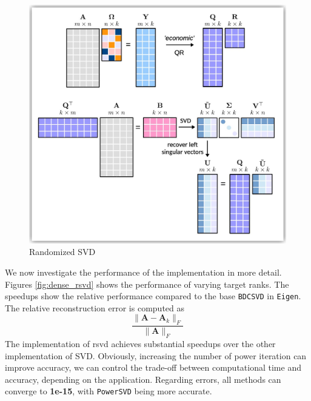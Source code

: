 \documentclass[11pt,a4paper]{article}
\begin{document}
\begin{figure}[H]
    \centering
    \includegraphics[height=0.2\textheight]{Images/rSVD.jpg}
    \caption{Randomized SVD \cite{erichsonRandomizedMatrixDecompositions2019}}
    \label{fig:rSVD}
\end{figure}

We now investigate the performance of the implementation in more detail. Figures \ref{fig:dense_rsvd} shows the performance of varying target ranks. The speedups show the relative performance compared to the base \texttt{BDCSVD} in \texttt{Eigen}. The relative reconstruction error is computed as \[ \frac{\|\mathbf{A} - \mathbf{A}_k\|_F}{\|\mathbf{A}\|_F} \] The implementation of rsvd achieves substantial speedups over the other implementation of SVD. Obviously, increasing the number of power iteration can improve accuracy, we can control the trade-off between computational time and accuracy, depending on the application. Regarding errors, all methods can converge to \textbf{1e-15}, with \texttt{PowerSVD} being more accurate.
\end{document}
